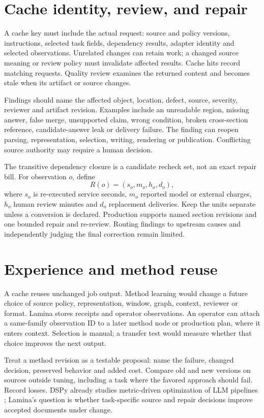 \documentclass[11pt,letterpaper]{article}
\begin{document}
\section{Cache identity, review, and repair}
A cache key must include the actual request: source and policy versions, instructions, selected task fields, dependency results, adapter identity and selected observations. Unrelated changes can retain work; a changed source meaning or review policy must invalidate affected results. Cache hits record matching requests. Quality review examines the returned content and becomes stale when its artifact or source changes.

Findings should name the affected object, location, defect, source, severity, reviewer and artifact revision. Examples include an unreadable region, missing answer, false merge, unsupported claim, wrong condition, broken cross-section reference, candidate-answer leak or delivery failure. The finding can reopen parsing, representation, selection, writing, rendering or publication. Conflicting source authority may require a human decision.

The transitive dependency closure is a candidate recheck set, not an exact repair bill. For observation $o$, define
\begin{equation}
R(o)=(s_o,m_o,h_o,d_o),
\label{eq:repair}
\end{equation}
where $s_o$ is re-executed service seconds, $m_o$ reported model or external charges, $h_o$ human review minutes and $d_o$ replacement deliveries. Keep the units separate unless a conversion is declared. Production supports named section revisions and one bounded repair and re-review. Routing findings to upstream causes and independently judging the final correction remain limited.

\section{Experience and method reuse}
A cache reuses unchanged job output. Method learning would change a future choice of source policy, representation, window, graph, context, reviewer or format. Lamina stores receipts and operator observations. An operator can attach a same-family observation ID to a later method node or production plan, where it enters context. Selection is manual; a transfer test would measure whether that choice improves the next output.

Treat a method revision as a testable proposal: name the failure, changed decision, preserved behavior and added cost. Compare old and new versions on sources outside tuning, including a task where the favored approach should fail. Record losses. DSPy already studies metric-driven optimization of LLM pipelines \cite{khattab2024dspy}; Lamina's question is whether task-specific source and repair decisions improve accepted documents under change.
\end{document}

